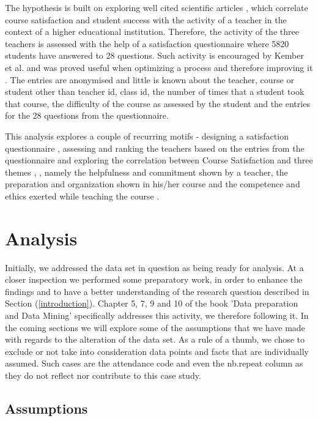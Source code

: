 \documentclass[twocolumn]{article}
\begin{document}
The hypothesis is built on exploring well cited scientific articles \cite{Dannetta2002}, \cite{Altun2017} which correlate course satisfaction and student success with the activity of a teacher in the context of a higher educational institution. Therefore, the activity of the three teachers is assessed with the help of a satisfaction questionnaire where 5820 students have answered to 28 questions. Such activity is encouraged by Kember et al. and was proved useful when optimizing a process and therefore improving it \cite{Kember2009}. The entries are anonymised and little is known about the teacher, course or student other than teacher id, class id, the number of times that a student took that course, the difficulty of the course as assessed by the student and the entries for the 28 questions from the questionnaire.

This analysis explores a couple of recurring motifs - designing a satisfaction questionnaire \cite{Krosnick2010}, assessing and ranking the teachers based on the entries from the questionnaire and exploring the correlation between Course Satisfaction and three themes \cite{Dannetta2002}, \cite{Altun2017}, namely the helpfulness and commitment shown by a teacher, the preparation and organization shown in his/her course and the competence and ethics exerted while teaching the course \cite{Akram}.  

\section{Analysis} \label{analysis}

Initially, we addressed the data set in question as being ready for analysis. At a closer inspection we performed some preparatory work, in order to enhance the findings and to have a  better understanding of the research question described in Section (\ref{introduction}). Chapter 5, 7, 9 and 10 of the book 'Data preparation and Data Mining' \cite{Pyle1999} specifically addresses this activity, we therefore following it. In the coming sections we will explore some of the assumptions that we have made with regards to the alteration of the data set. As a rule of a thumb, we chose to exclude or not take into consideration data points and facts that are individually assumed. Such cases are the attendance code and even the nb.repeat column as they do not reflect nor contribute to this case study.

    \subsection{Assumptions} 
    
\end{document}
